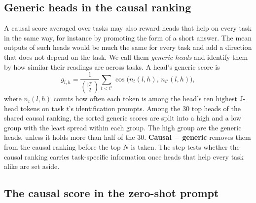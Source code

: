 \documentclass[10pt,a4paper]{article}
\begin{document}
\subsection{Generic heads in the causal ranking}\label{sec:generic}

A causal score averaged over tasks may also reward heads that help on every task in the same way, for instance by promoting the form of a short answer. The mean outputs of such heads would be much the same for every task and add a direction that does not depend on the task. We call them \emph{generic heads} and identify them by how similar their readings are across tasks. A head's generic score is
\begin{equation}
g_{l,h} = \frac{1}{\binom{|T|}{2}} \sum_{t<t'} \cos\big(n_{t}(l,h),\, n_{t'}(l,h)\big),
\end{equation}
where $n_t(l,h)$ counts how often each token is among the head's ten highest J-head tokens on task $t$'s identification prompts. Among the 30 top heads of the shared causal ranking, the sorted generic scores are split into a high and a low group with the least spread within each group. The high group are the generic heads, unless it holds more than half of the 30. \textbf{Causal $-$ generic} removes them from the causal ranking before the top $N$ is taken. The step tests whether the causal ranking carries task-specific information once heads that help every task alike are set aside.

\subsection{The causal score in the zero-shot prompt}\label{sec:causal-zs}
\end{document}
